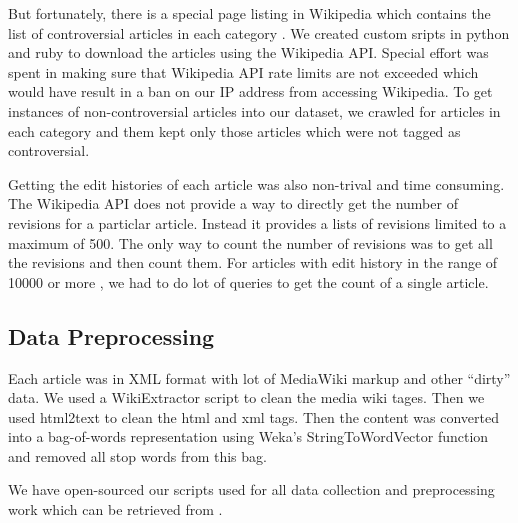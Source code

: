 \documentclass[twocolumn]{article}
\begin{document}
But fortunately, there is a special page listing in Wikipedia which
contains the list of controversial articles in each category
\cite{controversy}. We created custom sripts in python and ruby to
download the articles using the Wikipedia API. Special effort was
spent in making sure that Wikipedia API rate limits are not exceeded
which would have result in a ban on our IP address from accessing
Wikipedia. To get instances of non-controversial articles into our
dataset, we crawled for articles in each category and them kept only
those articles which were not tagged as controversial.

Getting the edit histories of each article was also non-trival and
time consuming. The Wikipedia API does not provide a way to directly
get the number of revisions for a particlar article. Instead it
provides a lists of revisions limited to a maximum of 500. The only
way to count the number of revisions was to get all the revisions and
then count them. For articles with edit history in the range of 10000
or more , we had to do lot of queries to get the count of a single
article.

\subsection{Data Preprocessing}

Each article was in XML format with lot of MediaWiki markup and other
``dirty'' data. We used a WikiExtractor script to clean the media wiki
tages. Then we used html2text to clean the html and xml tags. Then the
content was converted into a bag-of-words representation using Weka's
StringToWordVector function and removed all stop words from this bag. 

We have open-sourced our scripts used for all data collection and
preprocessing work which can be retrieved from \cite{github}.
\end{document}

